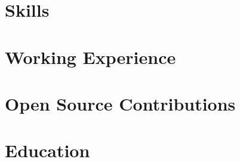 \documentclass[letter,10pt]{article}
\begin{document}

\section{Skills}


\section{Working Experience}


\section{Open Source Contributions}

\section{Education}


\end{document}
